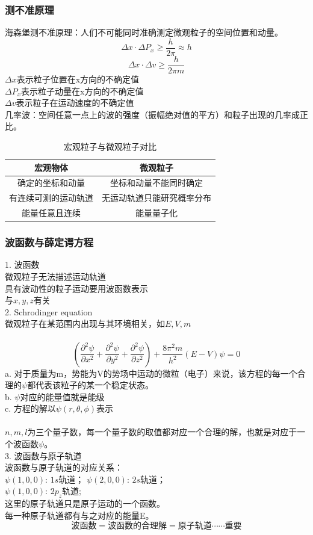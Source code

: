 \documentclass[utf8,a4paper,12pt]{ctexart}
\begin{document}
\subsubsection{测不准原理}
海森堡测不准原理：人们不可能同时准确测定微观粒子的空间位置和动量。
\[
\Delta x\cdot \Delta P_x \geq \frac{h}{2\pi} \approx h
\]
\[
\Delta x\cdot \Delta v \geq \frac{h}{2\pi m}
\]
$\Delta x$表示粒子位置在x方向的不确定值\\
$\Delta P_x$表示粒子动量在x方向的不确定值\\
$\Delta v$表示粒子在运动速度的不确定值\\
几率波：空间任意一点上的波的强度（振幅绝对值的平方）和粒子出现的几率成正比。\\
\begin{table}[h]
\centering
\begin{tabular}{cc}
\toprule
宏观物体&微观粒子\\
\hline
确定的坐标和动量&坐标和动量不能同时确定\\
有连续可测的运动轨道&无运动轨道只能研究概率分布\\
能量任意且连续&能量量子化\\
\bottomrule
\end{tabular}
\caption{宏观粒子与微观粒子对比}
\end{table}
\subsubsection{波函数与薛定谔方程}
1. 波函数\\
微观粒子无法描述运动轨道\\
具有波动性的粒子运动要用波函数表示\\
与$x, y, z$有关\\
2. Schrodinger equation\\
微观粒子在某范围内出现与其环境相关，如$E,V,m$\\\\
\begin{equation}
(\frac{\partial^2\psi}{\partial x^2}+\frac{\partial^2\psi}{\partial y^2}+\frac{\partial^2\psi}{\partial z^2}) + \frac{8\pi^2m}{h^2}(E-V)\psi = 0
\end{equation}
{\fangsong a. 对于质量为m，势能为V的势场中运动的微粒（电子）来说，该方程的每一个合理的$\psi$都代表该粒子的某一个稳定状态。\\
b. $\psi$对应的能量值就是能级\\
c. 方程的解以$\psi(r,\theta,\phi)$表示\\}\\
$n,m,l$为三个量子数，每一个量子数的取值都对应一个合理的解，也就是对应于一个波函数$\psi$。\\
3. 波函数与原子轨道\\
波函数与原子轨道的对应关系：\\
$\psi(1,0,0)$: $1s$轨道； $\psi(2,0,0)$: $2s$轨道；\\
$\psi(1,0,0)$: $2p_z$轨道;\\
这里的原子轨道只是原子运动的一个函数。\\
每一种原子轨道都有与之对应的能量E。\\
\[
\text{波函数} = \text{波函数的合理解} = \text{原子轨道} \cdots\cdots\text{重要}
\]
\end{document}
